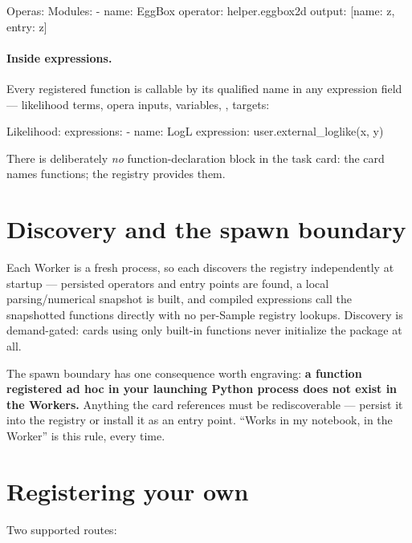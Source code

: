 \begin{yamlwin}
Operas:
  Modules:
    - name: EggBox
      operator: helper.eggbox2d
      output: [{name: z, entry: z}]
\end{yamlwin}

\paragraph{Inside expressions.} Every registered function is callable by its qualified
name in any expression field --- likelihood terms, opera inputs, 
variables, ,  targets:

\begin{yamlwin}
Likelihood:
  expressions:
    - name: LogL
      expression: user.external_loglike(x, y)
\end{yamlwin}

There is deliberately \emph{no} function-declaration block in the task card: the card
names functions; the registry provides them.

\section{Discovery and the spawn boundary}
\label{sec:operas-discovery}

Each Worker is a fresh  process, so each discovers the registry
independently at startup --- persisted operators and entry points are found, a local
parsing/numerical snapshot is built, and compiled expressions call the snapshotted
functions directly with no per-Sample registry lookups. Discovery is demand-gated:
cards using only built-in functions never initialize the package at all.

\begin{jwarn}
The spawn boundary has one consequence worth engraving: \textbf{a function registered
ad hoc in your launching Python process does not exist in the Workers.} Anything the
card references must be rediscoverable --- persist it into the registry or install it
as an entry point. ``Works in my notebook,  in the Worker'' is this
rule, every time.
\end{jwarn}

\section{Registering your own}
\label{sec:operas-registering}

Two supported routes:

